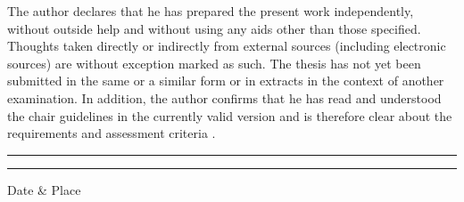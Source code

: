 The author declares that he has prepared the present work independently, without outside help and without using any aids other than those specified. Thoughts taken directly or indirectly from external sources (including electronic sources) are without exception marked as such. The thesis has not yet been submitted in the same or a similar form or in extracts in the context of another examination. In addition, the author confirms that he has read and understood the chair guidelines in the currently valid version and is therefore clear about the requirements and assessment criteria . \\[4cm]
\noindent\rule{5cm}{.4pt}\hfill\rule{5cm}{.4pt}\par 
\noindent Date \& Place \hfill \autor \\
